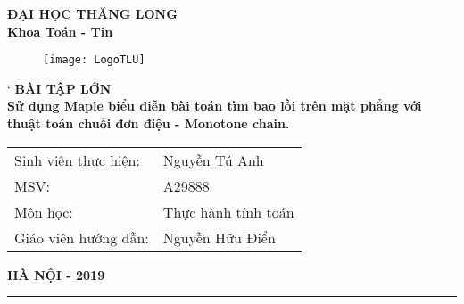 %
\begin{titlepage}
    \begin{center}
        {\bfseries ĐẠI HỌC THĂNG LONG\\Khoa Toán - Tin}
    \end{center}
    \begin{figure}[!ht]
        \centering
        \texttt{[image: LogoTLU]}
    \end{figure}
    \begin{center}
`       {\Large \bfseries BÀI TẬP LỚN\\}
        \vspace*{1cm}
        {\huge \bfseries  Sử dụng Maple biểu diễn bài toán tìm bao lồi trên mặt phẳng với thuật toán chuỗi đơn điệu - Monotone chain.}
    \end{center}
    \vspace*{1cm}
    \begin{flushright}
        \parbox[l]{8cm}{
            \bfseries
            \begin{tabular}{ l  l }
                Sinh viên thực hiện:& Nguyễn Tú Anh \\
                MSV:& A29888  \\
                Môn học:& Thực hành tính toán\\
                Giáo viên hướng dẫn:& Nguyễn Hữu Điển \\
            \end{tabular}
        }
    \end{flushright}
    \vfill
    \centerline{\bf HÀ NỘI - 2019}
\end{titlepage}
\vfill
\hrule
\thispagestyle{empty}